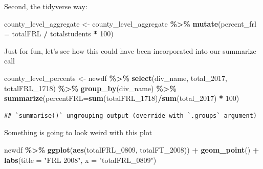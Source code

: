 \documentclass[
]{book}
\newenvironment{Shaded}{\begin{snugshade}}{\end{snugshade}}
\newcommand{\DataTypeTok}[1]{\textcolor[rgb]{0.13,0.29,0.53}{#1}}
\newcommand{\DecValTok}[1]{\textcolor[rgb]{0.00,0.00,0.81}{#1}}
\newcommand{\KeywordTok}[1]{\textcolor[rgb]{0.13,0.29,0.53}{\textbf{#1}}}
\newcommand{\NormalTok}[1]{#1}
\newcommand{\OperatorTok}[1]{\textcolor[rgb]{0.81,0.36,0.00}{\textbf{#1}}}
\newcommand{\StringTok}[1]{\textcolor[rgb]{0.31,0.60,0.02}{#1}}
\begin{document}
Second, the tidyverse way:

\begin{Shaded}
\begin{Highlighting}[]
\NormalTok{county\_level\_aggregate \textless{}{-}}\StringTok{ }\NormalTok{county\_level\_aggregate }\OperatorTok{\%\textgreater{}\%}\StringTok{ }
\StringTok{  }\KeywordTok{mutate}\NormalTok{(}\DataTypeTok{percent\_frl =}\NormalTok{ totalFRL }\OperatorTok{/}\StringTok{ }\NormalTok{totalstudents }\OperatorTok{*}\StringTok{ }\DecValTok{100}\NormalTok{)}
\end{Highlighting}
\end{Shaded}

Just for fun, let's see how this could have been incorporated into our summarize call

\begin{Shaded}
\begin{Highlighting}[]
\NormalTok{county\_level\_percents \textless{}{-}}\StringTok{ }\NormalTok{newdf }\OperatorTok{\%\textgreater{}\%}\StringTok{ }
\StringTok{  }\KeywordTok{select}\NormalTok{(div\_name, total\_}\DecValTok{2017}\NormalTok{, totalFRL\_}\DecValTok{1718}\NormalTok{) }\OperatorTok{\%\textgreater{}\%}
\StringTok{  }\KeywordTok{group\_by}\NormalTok{(div\_name) }\OperatorTok{\%\textgreater{}\%}
\StringTok{  }\KeywordTok{summarize}\NormalTok{(}\DataTypeTok{percentFRL=}\KeywordTok{sum}\NormalTok{(totalFRL\_}\DecValTok{1718}\NormalTok{)}\OperatorTok{/}\KeywordTok{sum}\NormalTok{(total\_}\DecValTok{2017}\NormalTok{) }\OperatorTok{*}\StringTok{ }\DecValTok{100}\NormalTok{)}
\end{Highlighting}
\end{Shaded}

\begin{verbatim}
## `summarise()` ungrouping output (override with `.groups` argument)
\end{verbatim}

Something is going to look weird with this plot

\begin{Shaded}
\begin{Highlighting}[]
\NormalTok{newdf }\OperatorTok{\%\textgreater{}\%}\StringTok{ }
\StringTok{  }\KeywordTok{ggplot}\NormalTok{(}\KeywordTok{aes}\NormalTok{(totalFRL\_}\DecValTok{0809}\NormalTok{, totalFT\_}\DecValTok{2008}\NormalTok{)) }\OperatorTok{+}
\StringTok{  }\KeywordTok{geom\_point}\NormalTok{() }\OperatorTok{+}
\StringTok{  }\KeywordTok{labs}\NormalTok{(}\DataTypeTok{title =} \StringTok{"FRL 2008"}\NormalTok{, }\DataTypeTok{x =} \StringTok{"totalFRL\_0809"}\NormalTok{)}
\end{Highlighting}
\end{Shaded}
\end{document}
